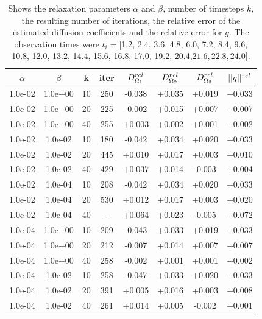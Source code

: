 \documentclass[11pt,a4paper]{article}
\begin{document}
\begin{table}
\centering
\caption{ Shows the relaxation parameters $\alpha$ and $\beta$, number of timesteps $k$, the resulting number of iterations, the relative error of the estimated diffusion coefficients and the relative error for $g$. The observation times were $t_i = [ $1.2, 2.4, 3.6, 4.8, 6.0, 7.2, 8.4, 9.6, 10.8, 12.0, 13.2, 14.4, 15.6, 16.8, 17.0, 19.2, 20.4,$ 21.6, 22.8, 24.0 ]$.}
\begin{tabular}{*{8}c}
$\alpha$ & $\beta$ & k & iter & $ D_{\Omega_1}\sp{rel}$ & $ D_{\Omega_2}\sp{rel}$ & $D_{\Omega_3}\sp{rel} $ & $|| g ||\sp{rel} $ \\
\hline

 1.0e-02 	 & 1.0e+00 	 & 10 & 250 	 & -0.038 & +0.035 & +0.019 & +0.033 \\ 
 1.0e-02 	 & 1.0e+00 	 & 20 & 225 	 & -0.002 & +0.015 & +0.007 & +0.007 \\ 
 1.0e-02 	 & 1.0e+00 	 & 40 & 255 	 & +0.003 & +0.002 & +0.001 & +0.002 \\ 

 1.0e-02 	 & 1.0e-02 	 & 10 & 180 	 & -0.042 & +0.034 & +0.020 & +0.033 \\ 
 1.0e-02 	 & 1.0e-02 	 & 20 & 445 	 & +0.010 & +0.017 & +0.003 & +0.010 \\ 
  1.0e-02 	 & 1.0e-02 	 & 40 & 429 	 & +0.037 & +0.014 & -0.003 & +0.004 \\ 
  
 1.0e-02 	 & 1.0e-04 	 & 10 & 208 	 & -0.042 & +0.034 & +0.020 & +0.033 \\ 
  1.0e-02 	 & 1.0e-04 	 & 20 & 530 	 & +0.012 & +0.017 & +0.003 & +0.020 \\ 
 1.0e-02 	 & 1.0e-04 	 & 40 & - 	 & +0.064 & +0.023 & -0.005 & +0.072 \\ 
 
 1.0e-04 	 & 1.0e+00 	 & 10 & 209 	 & -0.043 & +0.033 & +0.019 & +0.033 \\ 
 1.0e-04 	 & 1.0e+00 	 & 20 & 212 	 & -0.007 & +0.014 & +0.007 & +0.007 \\ 
 1.0e-04 	 & 1.0e+00 	 & 40 & 258 	 & -0.002 & +0.001 & +0.001 & +0.002 \\ 
 
 1.0e-04 	 & 1.0e-02 	 & 10 & 258 	 & -0.047 & +0.033 & +0.020 & +0.033 \\ 
 1.0e-04 	 & 1.0e-02 	 & 20 & 391 	 & +0.005 & +0.016 & +0.003 & +0.008 \\ 
 1.0e-04 	 & 1.0e-02 	 & 40 & 261 	 & +0.014 & +0.005 & -0.002 & +0.001 \\ 
 

\end{tabular}
\end{table}
\end{document}
